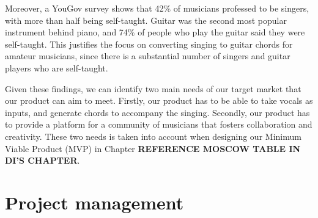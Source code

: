 Moreover, a YouGov survey \cite{YouGovMR} shows that 42\% of musicians professed to be singers, with more than half being self-taught. Guitar was the second most popular instrument behind piano, and 74\% of people who play the guitar said they were self-taught. This justifies the focus on converting singing to guitar chords for amateur musicians, since there is a substantial number of singers and guitar players who are self-taught.  

Given these findings, we can identify two main needs of our target market that our product can aim to meet. Firstly, our product has to be able to take vocals as inputs, and generate chords to accompany the singing. Secondly, our product has to provide a platform for a community of musicians that fosters collaboration and creativity. These two needs is taken into account when designing our Minimum Viable Product (MVP) in Chapter \textbf{REFERENCE MOSCOW TABLE IN DI'S CHAPTER}.


\section{Project management}

